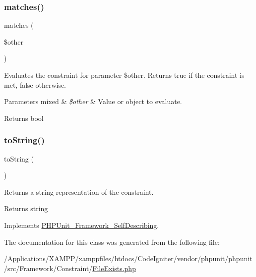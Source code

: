 \subsubsection{\texorpdfstring{matches()}{matches()}}
{\footnotesize\ttfamily matches (\begin{DoxyParamCaption}\item[{}]{\$other }\end{DoxyParamCaption})\hspace{0.3cm}{\ttfamily [protected]}}

Evaluates the constraint for parameter \$other. Returns true if the constraint is met, false otherwise.


\begin{DoxyParams}[1]{Parameters}
mixed & {\em \$other} & Value or object to evaluate.\\
\hline
\end{DoxyParams}
\begin{DoxyReturn}{Returns}
bool 
\end{DoxyReturn}
\mbox{\label{class_p_h_p_unit___framework___constraint___file_exists_a5558c5d549f41597377fa1ea8a1cefa3}} 
\subsubsection{\texorpdfstring{to\+String()}{toString()}}
{\footnotesize\ttfamily to\+String (\begin{DoxyParamCaption}{ }\end{DoxyParamCaption})}

Returns a string representation of the constraint.

\begin{DoxyReturn}{Returns}
string 
\end{DoxyReturn}


Implements \mbox{\hyperlink{interface_p_h_p_unit___framework___self_describing_a5558c5d549f41597377fa1ea8a1cefa3}{P\+H\+P\+Unit\+\_\+\+Framework\+\_\+\+Self\+Describing}}.



The documentation for this class was generated from the following file\+:\begin{DoxyCompactItemize}
\item 
/\+Applications/\+X\+A\+M\+P\+P/xamppfiles/htdocs/\+Code\+Igniter/vendor/phpunit/phpunit/src/\+Framework/\+Constraint/\mbox{\hyperlink{_file_exists_8php}{File\+Exists.\+php}}\end{DoxyCompactItemize}
